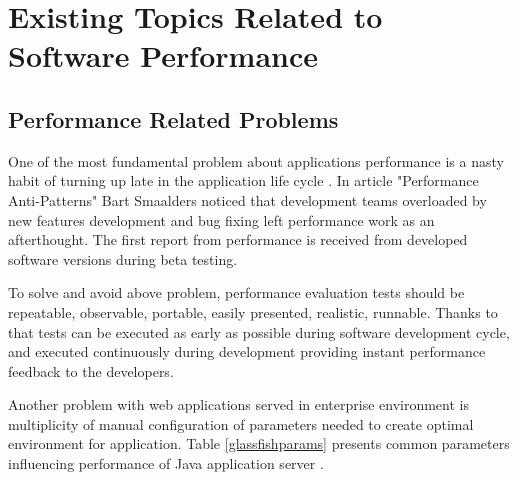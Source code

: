 \documentclass[12pt,a4paper]{article}
\begin{document}
\section{Existing Topics Related to Software Performance} \label{section:existiontopics}

\subsection{Performance Related Problems} \label{PerformanceRelatedProblems}
One of the most fundamental problem about applications performance is a nasty habit of turning up late in the application life cycle \cite{artperformance}. In article "Performance Anti-Patterns" \cite{lssrarticle} Bart Smaalders noticed that development teams overloaded by new features development and bug fixing left performance work as an afterthought. The first report from performance is received from developed software versions during beta testing.

To solve and avoid above problem, performance evaluation tests should be repeatable, observable, portable, easily presented, realistic, runnable. Thanks to that tests can be executed as early as possible during software development cycle, and executed continuously during development providing instant performance feedback to the developers. 

Another problem with web applications served in enterprise environment is multiplicity of manual configuration of parameters needed to create optimal environment for application. Table \ref{glassfishparams} presents common parameters influencing performance of Java application server \cite{glassfishdoc} \cite{deployerproblem}.  
\end{document}
